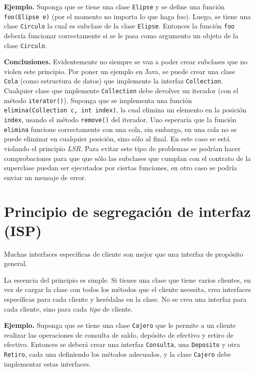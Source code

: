\documentclass{article}
\begin{document}
\textbf{Ejemplo.} Suponga que se tiene una clase \texttt{Elipse} y se define una función \texttt{foo(Elipse e)} (por el momento no importa lo que haga foo). Luego, se tiene una clase \texttt{Circulo} la cual es subclase de la clase \texttt{Elipse}. Entonces la función \texttt{foo} debería funcionar correctamente si se le pasa como argumento un objeto de la clase \texttt{Circulo}.

\textbf{Conclusiones.} Evidentemente no siempre se van a poder crear subclases que no violen este principio. Por poner un ejemplo en Java, se puede crear una clase \texttt{Cola} (como estructura de datos) que implemente la interfaz \texttt{Collection}. Cualquier clase que implemente \texttt{Collection} debe devolver un iterador (con el método \texttt{iterator()}). Suponga que se implementa una función \texttt{elimina(Collection c, int index)}, la cual elimina un elemento en la posición \texttt{index}, usando el método \texttt{remove()} del iterador. Uno esperaría que la función \texttt{elimina} funcione correctamente con una cola, sin embargo, en una cola no se puede eliminar en cualquier posición, sino sólo al final. En este caso se está violando el principio \textit{LSR}. Para evitar este tipo de problemas se podrían hacer comprobaciones para que que sólo las subclases que cumplan con el contrato de la superclase puedan ser ejecutados por ciertas funciones, en otro caso se podría enviar un mensaje de error.

\section{Principio de segregación de interfaz (ISP)}

Muchas interfaces específicas de cliente son mejor que una interfaz de propósito general.

La escencia del principio es simple. Si tienes una clase que tiene varios clientes, en vez de cargar la clase con todos los métodos que el cliente necesita, crea interfaces específicas para cada cliente y herédalas en la clase. No se crea una interfaz para cada cliente, sino para cada \textit{tipo} de cliente.

\textbf{Ejemplo.} Suponga que se tiene una clase \texttt{Cajero} que le permite a un cliente realizar las operaciones de consulta de saldo, depósito de efectivo y retiro de efectivo. Entonces se deberá crear una interfaz \texttt{Consulta}, una \texttt{Deposito} y otra \texttt{Retiro}, cada una definiendo los métodos adecuados, y la clase \texttt{Cajero} debe implementar estas interfaces.
\end{document}
